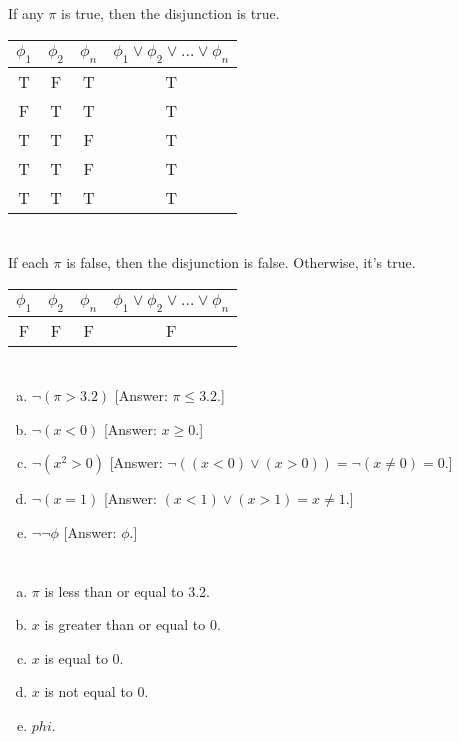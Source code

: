 \documentclass{article}
\begin{document}
If any $\pi$ is true, then the disjunction is true.

\begin{tabular}{ | c | c | c | c | }
  \hline
  $\phi_1$ & $\phi_2$ & $\phi_n$ & $\phi_1 \vee \phi_2 \vee \dots \vee \phi_n$ \\
  \hline
  T & F & T & T \\
  F & T & T & T \\
  T & T & F & T \\
  T & T & F & T \\
  T & T & T & T \\
  \hline
\end{tabular}

\section{}

If each $\pi$ is false, then the disjunction is false. Otherwise, it's true.

\begin{tabular}{ | c | c | c | c | }
  \hline
  $\phi_1$ & $\phi_2$ & $\phi_n$ & $\phi_1 \vee \phi_2 \vee \dots \vee \phi_n$ \\
  \hline
  F & F & F & F \\
  \hline
\end{tabular}


\section{}

\begin{enumerate}[(a)]
\item $\neg(\pi > 3.2)$ [Answer: $\pi \leq 3.2$.]
\item $\neg(x < 0)$ [Answer: $x \geq 0$.]
\item $\neg(x^2 > 0)$ [Answer: $\neg((x < 0) \vee (x > 0)) = \neg(x \neq 0) = 0$.]
\item $\neg(x = 1)$ [Answer: $(x < 1) \vee (x > 1) = x \neq 1$.]
\item $\neg\neg\phi$ [Answer: $\phi$.]
\end{enumerate}

\section{}

\begin{enumerate}[(a)]
\item $\pi$ is less than or equal to 3.2.
\item $x$ is greater than or equal to 0.
\item $x$ is equal to 0.
\item $x$ is not equal to 0.
\item $phi$.
\end{enumerate}
\end{document}
